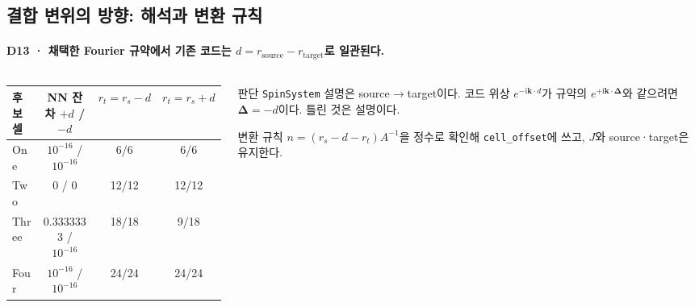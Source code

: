 \subsection{결합 변위의 방향: 해석과 변환 규칙}\label{displacement-resolution}
\begingroup%
  \framesubtitle{D13 · 채택한 Fourier 규약에서 기존 코드는 $d=r_{\mathrm{source}}-r_{\mathrm{target}}$로 일관된다.}
  \begin{columns}[T,onlytextwidth]
    \begin{column}{0.54\textwidth}
      \small
      \begin{tabular}{@{}lccc@{}}
        \toprule
        후보 셀 & NN 잔차 $+d$ / $-d$ & $r_t=r_s-d$ & $r_t=r_s+d$ \\
        \midrule
        One & $10^{-16}$ / $10^{-16}$ & 6/6 & 6/6 \\
        Two & 0 / 0 & 12/12 & 12/12 \\
        Three & 0.3333333 / $10^{-16}$ & 18/18 & 9/18 \\
        Four & $10^{-16}$ / $10^{-16}$ & 24/24 & 24/24 \\
        \bottomrule
      \end{tabular}\\[0.4em]
    \end{column}
    \begin{column}{0.42\textwidth}
      \begin{block}{판단}
        \texttt{SpinSystem} 설명은 source$\to$target이다. 코드 위상 $e^{-\mathrm i\mathbf k\cdot d}$가
        규약의 $e^{+\mathrm i\mathbf k\cdot\symbf\Delta}$와 같으려면 $\symbf\Delta=-d$이다.
        틀린 것은 설명이다.
      \end{block}
      \begin{block}{변환 규칙}
        $n=(r_s-d-r_t)A^{-1}$을 정수로 확인해 \texttt{cell\_offset}에 쓰고, $J$와 source·target은 유지한다.
      \end{block}
    \end{column}
  \end{columns}
  \par\smallskip
\endgroup


